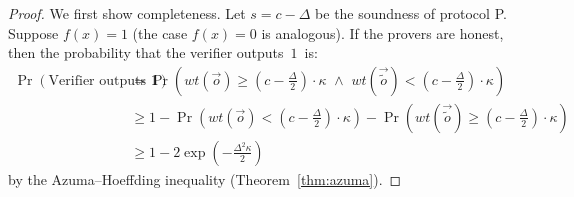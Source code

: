 \documentclass[11pt]{article}
\numberwithin{equation}{section}
\theoremstyle{definition}
\theoremstyle{plain}
\begin{document}
\begin{proof} We first show completeness. 
Let $s = c- \Delta$ be the soundness of protocol P.
Suppose $f(x) = 1$ (the case $f(x) = 0$ is analogous). If the provers are honest, then the probability that the verifier outputs~$1$~is:
\begin{align*}
\Pr(\mbox{Verifier outputs $1$}) &= \Pr \left(wt(\vec{o}) \geq \left(c - \frac{\Delta}{2}\right)\cdot \kappa \,\, \land \,\, wt(\vec{\tilde{o}}) < \left(c - \frac{\Delta}{2}\right)\cdot \kappa \right)\\
&\geq 1-\Pr \left(wt(\vec{o}) < \left(c - \frac{\Delta}{2}\right)\cdot \kappa \right) - \Pr \left(wt(\vec{\tilde{o}}) \geq \left(c - \frac{\Delta}{2}\right)\cdot \kappa \right) \\
&\geq 1 - 2\exp \left(-\frac{\Delta^2\kappa}{2}\right)
\end{align*}
\nopagebreak    %
%
by the Azuma--Hoeffding inequality  %
(Theorem~\ref{thm:azuma}).
%


\end{proof}
\end{document}
